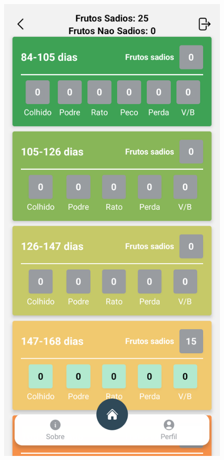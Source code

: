 \begin{figure}[H]
\begin{minipage}[b]{0.30\textwidth}
    \end{minipage}
    \hspace{3pt}
    \begin{minipage}[b]{0.30\textwidth}
        \centering
        \includegraphics[width=\textwidth]{images/app/11-collect.png}

\end{minipage}
\end{figure}
